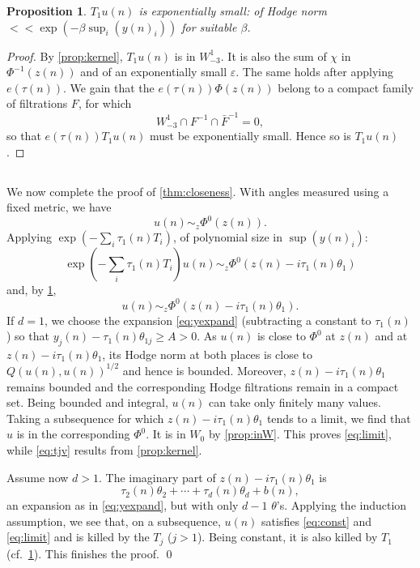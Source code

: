 \documentclass[11pt,a4paper]{article}
\theoremstyle{plain}
\newtheorem{proposition}[theorem]{Proposition}
\theoremstyle{definition}
\begin{document}
\begin{proposition}\label{prop:small}
$T_1 u(n)$ is exponentially small: of Hodge norm $<<\exp(-\beta\sup_i(y(n)_i))$ for suitable $\beta$.
\end{proposition}

\begin{proof}
By \ref{prop:kernel}, $T_1 u(n)$ is in $W^1_{-3}$. It is also the sum of $\chi$ in $\Phi^{-1}(z(n))$ and of an exponentially small $\varepsilon$. The same holds after applying $e(\tau(n))$. We gain that the $e(\tau(n))\Phi(z(n))$ belong to a compact family of filtrations $F$, for which
\[
W_{-3}^1\cap F^{-1}\cap\bar{F}^{-1}=0,
\]
so that $e(\tau(n))T_1 u(n)$ must be exponentially small. Hence so is $T_1 u(n)$.
\end{proof}

\subsection{}
We now complete the proof of \ref{thm:closeness}. With angles measured using a fixed metric, we have
\[
u(n)\sim_z\Phi^0(z(n)).
\]
Applying $\exp(-\sum_i\tau_1(n)T_i)$, of polynomial size in $\sup(y(n)_i)$:
\[
\exp(-\sum_i\tau_1(n)T_i)u(n)\sim_z\Phi^0(z(n)-i\tau_1(n)\theta_1)
\]
and, by \ref{prop:small},
\[
u(n)\sim_z\Phi^0(z(n)-i\tau_1(n)\theta_1).
\]
If $d=1$, we choose the expansion \eqref{eq:yexpand} (subtracting a constant to $\tau_1(n)$) so that $y_j(n)-\tau_1(n)\theta_{1j}\geq A>0$. As $u(n)$ is close to $\Phi^0$ at $z(n)$ and at $z(n)-i\tau_1(n)\theta_1$, its Hodge norm at both places is close to $Q(u(n),u(n))^{1/2}$ and hence is bounded. Moreover, $z(n)-i\tau_1(n)\theta_1$ remains bounded and the corresponding Hodge filtrations remain in a compact set. Being bounded and integral, $u(n)$ can take only finitely many values. Taking a subsequence for which $z(n)-i\tau_1(n)\theta_1$ tends to a limit, we find that $u$ is in the corresponding $\Phi^0$. It is in $W_0$ by \ref{prop:inW}. This proves \eqref{eq:limit}, while \eqref{eq:tjv} results from \ref{prop:kernel}.

Assume now $d>1$. The imaginary part of $z(n)-i\tau_1(n)\theta_1$ is
\[
\tau_2(n)\theta_2+\cdots+\tau_d(n)\theta_d+b(n),
\]
an expansion as in \eqref{eq:yexpand}, but with only $d-1$ $\theta$'s. Applying the induction assumption, we see that, on a subsequence, $u(n)$ satisfies \eqref{eq:const} and \eqref{eq:limit} and is killed by the $T_j$ ($j>1$). Being constant, it is also killed by $T_1$ (cf.\ \ref{prop:small}). This finishes the proof. \qed
\end{document}
